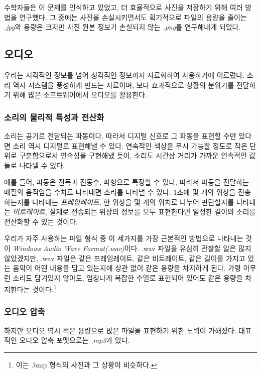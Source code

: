 \documentclass{article}
\begin{document}
수학자들은 이 문제를 인식하고 있었고, 더 효율적으로 사진을 저장하기 위해 여러 방법을 연구했다.
그 중에는 사진을 손실시키면서도 획기적으로 파일의 용량을 줄이는 \textit{.jpg}와 용량은 크지만
사진 원본 정보가 손실되지 않는 \textit{.png}를 연구해내게 되었다.

\subsection{오디오}

우리는 시각적인 정보를 넘어 청각적인 정보까지 자료화하여 사용하기에 이르렀다.
소리 역시 시스템을 풍성하게
만드는 자료이며, 보다 효과적으로 상황의 분위기를 전달하기 위해 많은 소프트웨어에서 오디오를 활용한다.

\subsubsection{소리의 물리적 특성과 전산화}

소리는 공기로 전달되는 파동이다. 따라서 디지털 신호로 그 파동을 표현할 수만 있다면 소리 역시
디지털로 표현해낼 수 있다.
연속적인 색상을 무시 가능할 정도로 작은 단위로 구분함으로서 연속성을 구현해냈 듯이, 소리도 시간상
거리가 가까운 연속적인 값들로 나타낼 수 있다.

예를 들어, 파동은 진폭과 진동수, 파형으로 특정할 수 있다. 따라서 파동을 전달하는 매질의 움직임을
수치로 나타내면 소리를 나타낼 수 있다.
1초에 몇 개의 위상을 전송하는지를 나타내는 \textit{프레임레이트}, 한 위상을 몇 개의 위치로
나누어 판단할지를
나타내는 \textit{비트레이트}, 실제로 전송되는 위상의 정보를 모두 표현한다면 일정한 길이의 소리를
전산화할 수 있는 것이다.

우리가 자주 사용하는 파일 형식 중 이 세가지를 가장 근본적인 방법으로 나타내는 것이
\textit{Windows Audio Wave Format(.wav)}이다.
.wav 파일을 유심히 관찰할 일은 많지 않았겠지만,
.wav 파일은 같은 프레임레이트, 같은 비트레이트, 같은 길이를 가지고 있는 음악이 어떤 내용을
담고 있는지에 상관 없이 같은 용량을 차지하게 된다.
가령 아무런 소리도 담겨있지 않아도, 엄청나게 복잡한 수열로 표현되어 있어도 같은 용량을 차지한다는
것이다.\footnote{이는 .bmp 형식의 사진과 그 상황이 비슷하다.}

\subsubsection{오디오 압축}

하지만 오디오 역시 적은 용량으로 많은 파일을 표현하기 위한 노력이 가해졌다.
대표적인 오디오 압축 포맷으로는 \textit{.mp3}가 있다.
\end{document}
